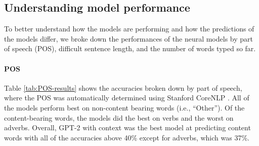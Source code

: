 \documentclass[11pt]{article}
\begin{document}
\begin{table}[t]
\centering
{}
\caption{\label{tab:context_information} Sample output for simplifying the difficult sentence ``\textit{Each pseudostem can produce a single bunch of bananas.}'' using GPT-2 with and without context.  ``Actual'' indicates the word that should be predicted.}
\vspace{-2mm}
\end{table}

\subsection{Understanding model performance}

To better understand how the models are performing and how the predictions of the models differ, we broke down the performances of the neural models by part of speech (POS), difficult sentence length, and the number of words typed so far.

\vspace{-1mm}
\paragraph{POS} Table \ref{tab:POS-results} shows the accuracies broken down by part of speech, where the POS was automatically determined using Stanford CoreNLP  \cite{manning2014corenlp}.  All of the models perform best on non-content bearing words (i.e., ``Other'').  Of the content-bearing words, the models did the best on verbs and the worst on adverbs.  Overall, GPT-2 with context was the best model at predicting content words with all of the accuracies above 40\% except for adverbs, which was 37\%.
\end{document}

